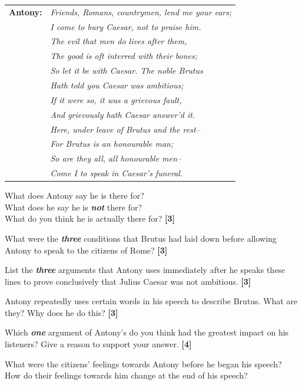 \documentclass[12pt,a4paper]{article}
\newcommand{\qmarks}[1]{\hfill\textbf{[#1]}}
\begin{document}
\vspace{4pt}
\begin{tabular}{@{}l@{\hspace{1cm}}l@{}}
\textbf{Antony:} & \textit{Friends, Romans, countrymen, lend me your ears;} \\
 & \textit{I come to bury Caesar, not to praise him.} \\
 & \textit{The evil that men do lives after them,} \\
 & \textit{The good is oft interred with their bones;} \\
 & \textit{So let it be with Caesar. The noble Brutus} \\
 & \textit{Hath told you Caesar was ambitious;} \\
 & \textit{If it were so, it was a grievous fault,} \\
 & \textit{And grievously hath Caesar answer'd it.} \\
 & \textit{Here, under leave of Brutus and the rest--} \\
 & \textit{For Brutus is an honourable man;} \\
 & \textit{So are they all, all honourable men--} \\
 & \textit{Come I to speak in Caesar's funeral.}
\end{tabular}

\vspace{8pt}

\begin{romanenum}
    \item What does Antony say he is there for?\\
          What does he say he is \textbf{\textit{not}} there for?\\
          What do you think he is actually there for? \qmarks{3}

    \item What were the \textbf{\textit{three}} conditions that Brutus had laid down before allowing Antony to speak to the citizens of Rome? \qmarks{3}

    \item List the \textbf{\textit{three}} arguments that Antony uses immediately after he speaks these lines to prove conclusively that Julius Caesar was not ambitious. \qmarks{3}

    \item Antony repeatedly uses certain words in his speech to describe Brutus. What are they? Why does he do this? \qmarks{3}

    \item Which \textbf{\textit{one}} argument of Antony's do you think had the greatest impact on his listeners? Give a reason to support your answer. \qmarks{4}

    What were the citizens' feelings towards Antony before he began his speech?\\
    How do their feelings towards him change at the end of his speech?
\end{romanenum}
\end{document}
